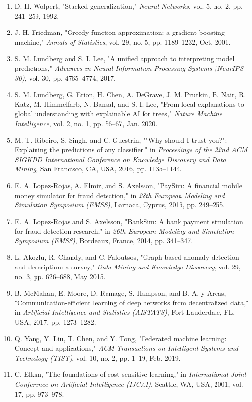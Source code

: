 \documentclass[12pt,a4paper,oneside]{report}
\begin{document}
\begin{enumerate}[leftmargin=0.35in]
\item D. H. Wolpert, "Stacked generalization," \textit{Neural Networks}, vol. 5, no. 2, pp. 241--259, 1992.
\item J. H. Friedman, "Greedy function approximation: a gradient boosting machine," \textit{Annals of Statistics}, vol. 29, no. 5, pp. 1189--1232, Oct. 2001.
\item S. M. Lundberg and S. I. Lee, "A unified approach to interpreting model predictions," \textit{Advances in Neural Information Processing Systems (NeurIPS 30)}, vol. 30, pp. 4765--4774, 2017.
\item S. M. Lundberg, G. Erion, H. Chen, A. DeGrave, J. M. Prutkin, B. Nair, R. Katz, M. Himmelfarb, N. Bansal, and S. I. Lee, "From local explanations to global understanding with explainable AI for trees," \textit{Nature Machine Intelligence}, vol. 2, no. 1, pp. 56--67, Jan. 2020.
\item M. T. Ribeiro, S. Singh, and C. Guestrin, ""Why should I trust you?": Explaining the predictions of any classifier," in \textit{Proceedings of the 22nd ACM SIGKDD International Conference on Knowledge Discovery and Data Mining}, San Francisco, CA, USA, 2016, pp. 1135--1144.
\item E. A. Lopez-Rojas, A. Elmir, and S. Axelsson, "PaySim: A financial mobile money simulator for fraud detection," in \textit{28th European Modeling and Simulation Symposium (EMSS)}, Larnaca, Cyprus, 2016, pp. 249--255.
\item E. A. Lopez-Rojas and S. Axelsson, "BankSim: A bank payment simulation for fraud detection research," in \textit{26th European Modeling and Simulation Symposium (EMSS)}, Bordeaux, France, 2014, pp. 341--347.
\item L. Akoglu, R. Chandy, and C. Faloutsos, "Graph based anomaly detection and description: a survey," \textit{Data Mining and Knowledge Discovery}, vol. 29, no. 3, pp. 626--688, May 2015.
\item B. McMahan, E. Moore, D. Ramage, S. Hampson, and B. A. y Arcas, "Communication-efficient learning of deep networks from decentralized data," in \textit{Artificial Intelligence and Statistics (AISTATS)}, Fort Lauderdale, FL, USA, 2017, pp. 1273--1282.
\item Q. Yang, Y. Liu, T. Chen, and Y. Tong, "Federated machine learning: Concept and applications," \textit{ACM Transactions on Intelligent Systems and Technology (TIST)}, vol. 10, no. 2, pp. 1--19, Feb. 2019.
\item C. Elkan, "The foundations of cost-sensitive learning," in \textit{International Joint Conference on Artificial Intelligence (IJCAI)}, Seattle, WA, USA, 2001, vol. 17, pp. 973--978.

\end{enumerate}
\end{document}
